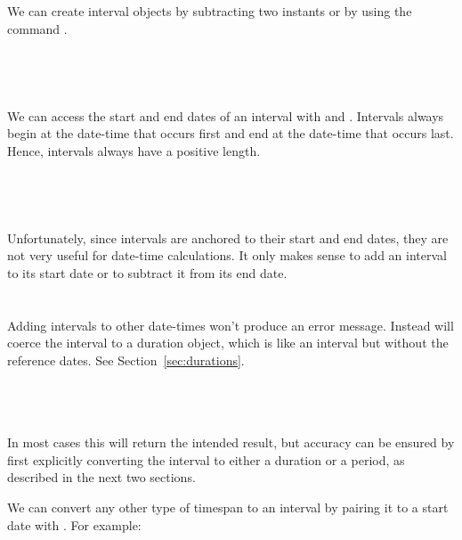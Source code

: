 \documentclass[article]{jss}
\begin{document}
We can create interval objects by subtracting two instants or by using the command .\\

\\
\\
\\
\\

We can access the start and end dates of an interval with  and . Intervals always begin at the date-time that occurs first and end at the date-time that occurs last. Hence, intervals always have a positive length.\\

\\
\\
\\
\\


Unfortunately, since intervals are anchored to their start and end dates, they are not very useful for date-time calculations. It only makes sense to add an interval to its start date or to subtract it from its end date.\\

\\
\\

Adding intervals to other date-times won't produce an error message. Instead  will coerce the interval to a duration object, which is like an interval but without the reference dates. See Section~\ref{sec:durations}.

\\
\\
\\

In most cases this will return the intended result, but accuracy can be ensured by first explicitly converting the interval to either a duration or a period, as described in the next two sections.

We can convert any other type of timespan to an interval by pairing it to a start date with . For example:
\end{document}
